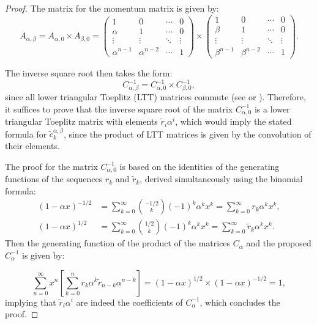 \documentclass{article} %
\begin{document}
\inversesquareroot*
\begin{proof}

The matrix for the momentum matrix is given by:
\begin{equation}
    A_{\alpha, \beta} = A_{\alpha, 0} \times A_{\beta, 0} = \begin{pmatrix}
        1 & 0 &  \cdots & 0 \\
        \alpha & 1 & \cdots & 0 \\
        \vdots & \vdots & \ddots & \vdots \\
        \alpha^{n - 1} & \alpha^{n-2} & \cdots & 1
    \end{pmatrix} \times \begin{pmatrix}
        1 & 0 &  \cdots & 0 \\
        \beta & 1 &  \cdots & 0 \\
        \vdots & \vdots & \ddots & \vdots \\
        \beta^{n - 1} & \beta^{n-2}  & \cdots & 1
    \end{pmatrix}.
\end{equation}

The inverse square root then takes the form:
\begin{equation}
    C^{-1}_{\alpha, \beta} = C^{-1}_{\alpha, 0} \times C^{-1}_{\beta, 0},
\end{equation}
since all lower triangular Toeplitz (LTT) matrices commute (see \citet{strang1986proposal} or \citet{Toeplitz}). Therefore, it suffices to prove that the inverse square root of the matrix $C_{\alpha, 0}^{-1}$ is a lower triangular Toeplitz matrix with elements $\tilde{r}_i \alpha^{i}$, which would imply the stated formula for $\tilde{c}_k^{\alpha, \beta}$, since the product of LTT matrices is given by the convolution of their elements.



The proof for the matrix $C_{\alpha, 0}^{-1}$ is based on the identities of the generating functions of the sequences $ r_k$ and $\tilde{r}_k$, derived simultaneously using the binomial formula:
\begin{equation}
\begin{aligned}
(1 - \alpha x)^{-1/2} &= \sum\limits_{k = 0}^{\infty} \binom{-1/2}{k}(-1)^k\alpha^k x^k = \sum\limits_{k = 0}^{\infty} r_k \alpha^k x^k, \\
(1 - \alpha x)^{1/2} &= \sum\limits_{k = 0}^{\infty} \binom{1/2}{k}(-1)^k \alpha^k x^k = \sum\limits_{k = 0}^{\infty} \tilde{r}_k \alpha^k x^k.
\end{aligned}
\end{equation}
Then the generating function of the product of the matrices $C_{\alpha}$ and the proposed $C_{\alpha}^{-1}$ is given by:

\begin{equation}
\sum\limits_{n = 0}^{\infty} x^n \left[\sum\limits_{k = 0}^{n} r_{k}\alpha^k \tilde{r}_{n - k} \alpha^{n - k}\right] = (1 - \alpha x)^{1/2} \times (1 - \alpha x)^{-1/2} = 1,
\end{equation}
implying that $\tilde{r}_i\alpha^{i}$ are indeed the coefficients of $C_{\alpha}^{-1}$, which concludes the proof. 
\end{proof}
\end{document}
